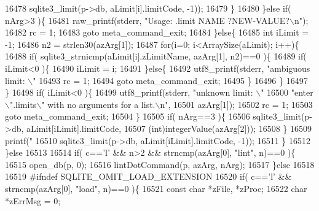 \begin{DoxyCode}
{{{{{{{{{{{{{{{{{{{{{{{{{{{{{{{{{{{{{{{{{{{{{{{{{{{16478                sqlite3_limit(p->db, aLimit[i].limitCode, -1));
16479       \}
16480     \}\textcolor{keywordflow}{else} \textcolor{keywordflow}{if}( nArg>3 )\{
16481       raw_printf(stderr, \textcolor{stringliteral}{"Usage: .limit NAME ?NEW-VALUE?\(\backslash\)n"});
16482       rc = 1;
16483       \textcolor{keywordflow}{goto} meta\_command\_exit;
16484     \}\textcolor{keywordflow}{else}\{
16485       \textcolor{keywordtype}{int} iLimit = -1;
16486       n2 = strlen30(azArg[1]);
16487       \textcolor{keywordflow}{for}(i=0; i<ArraySize(aLimit); i++)\{
16488         \textcolor{keywordflow}{if}( sqlite3_strnicmp(aLimit[i].zLimitName, azArg[1], n2)==0 )\{
16489           \textcolor{keywordflow}{if}( iLimit<0 )\{
16490             iLimit = i;
16491           \}\textcolor{keywordflow}{else}\{
16492             utf8_printf(stderr, \textcolor{stringliteral}{"ambiguous limit: \(\backslash\)"%
16493             rc = 1;
16494             \textcolor{keywordflow}{goto} meta\_command\_exit;
16495           \}
16496         \}
16497       \}
16498       \textcolor{keywordflow}{if}( iLimit<0 )\{
16499         utf8_printf(stderr, \textcolor{stringliteral}{"unknown limit: \(\backslash\)"%
16500                         \textcolor{stringliteral}{"enter \(\backslash\)".limits\(\backslash\)" with no arguments for a list.\(\backslash\)n"},
16501                          azArg[1]);
16502         rc = 1;
16503         \textcolor{keywordflow}{goto} meta\_command\_exit;
16504       \}
16505       \textcolor{keywordflow}{if}( nArg==3 )\{
16506         sqlite3_limit(p->db, aLimit[iLimit].limitCode,
16507                       (\textcolor{keywordtype}{int})integerValue(azArg[2]));
16508       \}
16509       printf(\textcolor{stringliteral}{"%
16510              sqlite3_limit(p->db, aLimit[iLimit].limitCode, -1));
16511     \}
16512   \}\textcolor{keywordflow}{else}
16513 
16514   \textcolor{keywordflow}{if}( c==\textcolor{charliteral}{'l'} && n>2 && strncmp(azArg[0], \textcolor{stringliteral}{"lint"}, n)==0 )\{
16515     open_db(p, 0);
16516     lintDotCommand(p, azArg, nArg);
16517   \}\textcolor{keywordflow}{else}
16518 
16519 \textcolor{preprocessor}{#ifndef SQLITE\_OMIT\_LOAD\_EXTENSION}
16520   \textcolor{keywordflow}{if}( c==\textcolor{charliteral}{'l'} && strncmp(azArg[0], \textcolor{stringliteral}{"load"}, n)==0 )\{
16521     \textcolor{keyword}{const} \textcolor{keywordtype}{char} *zFile, *zProc;
16522     \textcolor{keywordtype}{char} *zErrMsg = 0;
}}}}}}}}}}}}}}}}}}}}}}}}}}}}}}}}}}}}}}}}}}}}}}}}}}}}}}
\end{DoxyCode}

